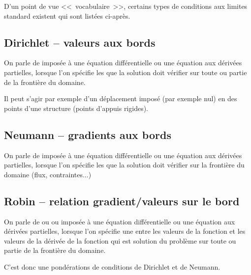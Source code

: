 D'un point de vue <<~vocabulaire~>>, certains types de conditions aux limites standard
existent qui sont listées ci-après.

\medskip
\subsection{Dirichlet -- valeurs aux bords}

On parle de  imposée à une équation différentielle ou une équation aux dérivées partielles,
lorsque l'on spécifie les  que la solution doit vérifier sur toute ou partie de
la frontière du domaine.

\medskip
Il peut s'agir par exemple d'un déplacement imposé (par exemple nul) en des points
d'une structure (points d'appuis rigides).

\medskip
\subsection{Neumann -- gradients aux bords}

On parle de  imposée à une équation différentielle ou une équation aux dérivées partielles,
lorsque l'on spécifie les  que la solution doit vérifier sur la frontière du 
domaine (flux, contraintes...)

\medskip
\subsection{Robin -- relation gradient/valeurs sur le bord}

On parle de  ou  
ou  imposée à une équation différentielle ou une équation aux dérivées partielles,
lorsque l'on spécifie une  entre les valeurs de la fonction et les
valeurs de la dérivée de la fonction qui est solution du problème sur toute ou partie de
la frontière du domaine.

C'est donc une pondérations de conditions de Dirichlet et de Neumann.


